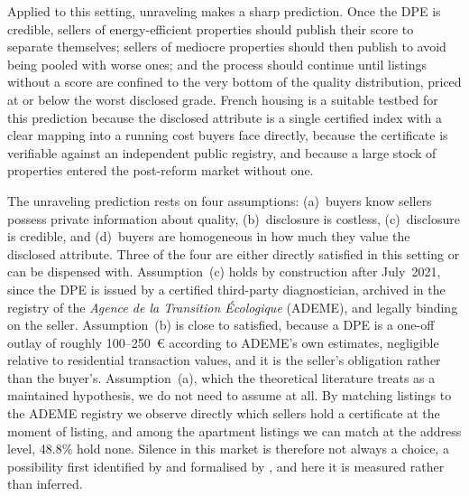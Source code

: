 Applied to this setting, unraveling makes a sharp prediction. Once the DPE is credible, sellers
of energy-efficient properties should publish their score to separate themselves; sellers of
mediocre properties should then publish to avoid being pooled with worse ones; and the process
should continue until listings without a score are confined to the very bottom of the quality
distribution, priced at or below the worst disclosed grade. French housing is a suitable
testbed for this prediction because the disclosed attribute is a single certified index with a
clear mapping into a running cost buyers face directly, because the certificate is verifiable
against an independent public registry, and because a large stock of properties entered the
post-reform market without one.

The unraveling prediction rests on four assumptions: (a)~buyers know sellers possess private
information about quality, (b)~disclosure is costless, (c)~disclosure is credible, and
(d)~buyers are homogeneous in how much they value the disclosed attribute. Three of the four are
either directly satisfied in this setting or can be dispensed with. Assumption~(c) holds by
construction after July~2021, since the DPE is issued by a certified third-party diagnostician,
archived in the registry of the \emph{Agence de la Transition \'Ecologique} (ADEME), and legally
binding on the seller. Assumption~(b) is close to satisfied, because a DPE is a one-off outlay of
roughly 100--250~\euro{} according to ADEME's own estimates, negligible relative to
residential transaction values, and it is the seller's obligation rather than the buyer's.
Assumption~(a), which the theoretical literature treats as a maintained hypothesis, we do not
need to assume at all. By matching listings to the ADEME registry we observe directly which
sellers hold a certificate at the moment of listing, and among the apartment listings we can
match at the address level, 48.8\% hold none.
Silence in this market is therefore not always a choice, a possibility first identified by
\citet{dye_disclosure_1985} and formalised by \citet{jung_kwon_1988}, and here it is measured
rather than inferred.

